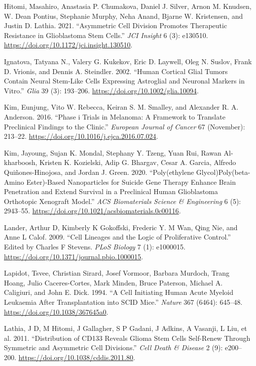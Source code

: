 \documentclass[
  letterpaper,
]{scrreprt}
\newlength{\cslhangindent}
\newenvironment{CSLReferences}[2] %
 {\begin{list}{}{%
  \setlength{\itemindent}{0pt}
  \setlength{\leftmargin}{0pt}
  \setlength{\parsep}{0pt}
  \ifodd #1
   \setlength{\leftmargin}{\cslhangindent}
   \setlength{\itemindent}{-1\cslhangindent}
  \fi
  \setlength{\itemsep}{#2\baselineskip}}}
 {\end{list}}
\theoremstyle{definition}
\theoremstyle{remark}
\begin{document}
\begin{CSLReferences}{1}{0}
Hitomi, Masahiro, Anastasia P. Chumakova, Daniel J. Silver, Arnon M.
Knudsen, W. Dean Pontius, Stephanie Murphy, Neha Anand, Bjarne W.
Kristensen, and Justin D. Lathia. 2021. {``Asymmetric Cell Division
Promotes Therapeutic Resistance in Glioblastoma Stem Cells.''} \emph{JCI
Insight} 6 (3): e130510.
\url{https://doi.org/10.1172/jci.insight.130510}.

Ignatova, Tatyana N., Valery G. Kukekov, Eric D. Laywell, Oleg N.
Suslov, Frank D. Vrionis, and Dennis A. Steindler. 2002. {``Human
Cortical Glial Tumors Contain Neural Stem{-}Like Cells Expressing
Astroglial and Neuronal Markers in Vitro.''} \emph{Glia} 39 (3):
193--206. \url{https://doi.org/10.1002/glia.10094}.

Kim, Eunjung, Vito W. Rebecca, Keiran S. M. Smalley, and Alexander R. A.
Anderson. 2016. {``Phase i Trials in Melanoma: A Framework to Translate
Preclinical Findings to the Clinic.''} \emph{European Journal of Cancer}
67 (November): 213--22.
\url{https://doi.org/10.1016/j.ejca.2016.07.024}.

Kim, Jayoung, Sujan K. Mondal, Stephany Y. Tzeng, Yuan Rui, Rawan
Al-kharboosh, Kristen K. Kozielski, Adip G. Bhargav, Cesar A. Garcia,
Alfredo Quiñones-Hinojosa, and Jordan J. Green. 2020. {``Poly(ethylene
Glycol){\textendash}Poly(beta-Amino Ester)-Based Nanoparticles for
Suicide Gene Therapy Enhance Brain Penetration and Extend Survival in a
Preclinical Human Glioblastoma Orthotopic Xenograft Model.''} \emph{ACS
Biomaterials Science \& Engineering} 6 (5): 2943--55.
\url{https://doi.org/10.1021/acsbiomaterials.0c00116}.

Lander, Arthur D, Kimberly K Gokoffski, Frederic Y. M Wan, Qing Nie, and
Anne L Calof. 2009. {``Cell Lineages and the Logic of Proliferative
Control.''} Edited by Charles F Stevens. \emph{PLoS Biology} 7 (1):
e1000015. \url{https://doi.org/10.1371/journal.pbio.1000015}.

Lapidot, Tsvee, Christian Sirard, Josef Vormoor, Barbara Murdoch, Trang
Hoang, Julio Caceres-Cortes, Mark Minden, Bruce Paterson, Michael A.
Caligiuri, and John E. Dick. 1994. {``A Cell Initiating Human Acute
Myeloid Leukaemia After Transplantation into SCID Mice.''} \emph{Nature}
367 (6464): 645--48. \url{https://doi.org/10.1038/367645a0}.

Lathia, J D, M Hitomi, J Gallagher, S P Gadani, J Adkins, A Vasanji, L
Liu, et al. 2011. {``Distribution of CD133 Reveals Glioma Stem Cells
Self-Renew Through Symmetric and Asymmetric Cell Divisions.''}
\emph{Cell Death \& Disease} 2 (9): e200--200.
\url{https://doi.org/10.1038/cddis.2011.80}.


\end{CSLReferences}
\end{document}
